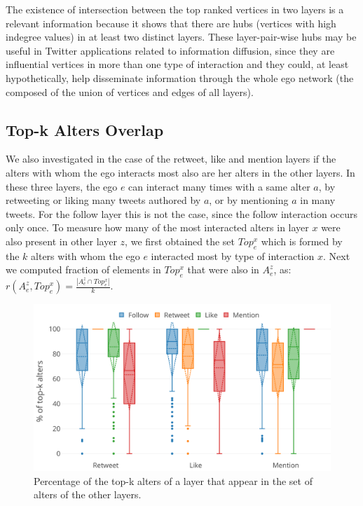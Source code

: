 The existence of intersection between the top ranked vertices in two layers is a relevant information because it shows that there are hubs (vertices with high indegree values) in at least two distinct layers. These layer-pair-wise hubs may be useful in Twitter applications related to information diffusion, since they are influential vertices in more than one type of interaction and they could, at least hypothetically, help disseminate information through the whole ego network (the composed of the union  of vertices and edges of all layers). 



\subsection*{Top-k Alters Overlap}
\label{subsec:topk_overlap}

We also investigated in the case of the retweet, like and mention layers if the alters with whom the ego interacts most also are her alters in the other layers. In these three layers, the ego $e$ can interact many times with a same alter $a$, by retweeting or liking many tweets authored by $a$, or by mentioning $a$ in many tweets. For the follow layer this is not the case, since the follow interaction occurs only once. To measure how many of the most interacted alters in layer $x$ were also present in other layer $z$, we first obtained the set $Top_e^x$ which is formed by the $k$ alters with whom the ego $e$ interacted most by type of interaction $x$. Next we computed fraction of elements in $Top_e^x$ that  were also in  $A_e^z$, as: $r(A_e ^z,Top_e^x) =\frac{|A_e^z \cap Top_e^x|}{k}$.

\begin{figure}[h!tb]
    \centering
    \includegraphics[width=1\textwidth]{fig/net_struct/topk_co_occurrence_boxplot.png}
    \caption{Percentage of the top-k alters of a layer that appear in the set of alters of the other layers.}
    \label{fig:net_struct_topk_over_alters}
\end{figure}


